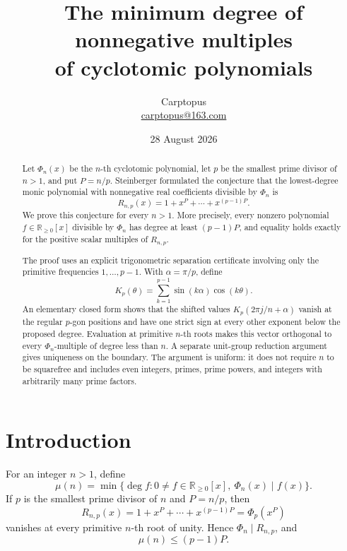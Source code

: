 \documentclass[11pt]{article}
\title{The minimum degree of nonnegative multiples\\
of cyclotomic polynomials}
\author{Carptopus\\\href{mailto:carptopus@163.com}{carptopus@163.com}}
\date{28 August 2026}
\numberwithin{equation}{section}
\begin{document}
\maketitle

\begin{center}
\end{center}

\begin{abstract}
Let $\Phi_n(x)$ be the $n$-th cyclotomic polynomial, let $p$ be the smallest
prime divisor of $n>1$, and put $P=n/p$. Steinberger formulated the conjecture
that the lowest-degree monic polynomial with nonnegative real coefficients
divisible by $\Phi_n$ is
\[
R_{n,p}(x)=1+x^P+\cdots+x^{(p-1)P}.
\]
We prove this conjecture for every $n>1$. More precisely, every nonzero
polynomial $f\in\mathbb R_{\geq0}[x]$ divisible by $\Phi_n$ has degree at
least $(p-1)P$, and equality holds exactly for the positive scalar multiples
of $R_{n,p}$.

The proof uses an explicit trigonometric separation certificate involving only
the primitive frequencies $1,\ldots,p-1$. With $\alpha=\pi/p$, define
\[
K_p(\theta)=\sum_{k=1}^{p-1}\sin(k\alpha)\cos(k\theta).
\]
An elementary closed form shows that the shifted values
$K_p(2\pi j/n+\alpha)$ vanish at the regular $p$-gon positions and have one
strict sign at every other exponent below the proposed degree. Evaluation at
primitive $n$-th roots makes this vector orthogonal to every $\Phi_n$-multiple
of degree less than $n$. A separate unit-group reduction argument gives
uniqueness on the boundary. The argument is uniform: it does not require $n$
to be squarefree and includes even integers, primes, prime powers, and integers
with arbitrarily many prime factors.
\end{abstract}

\section{Introduction}

For an integer $n>1$, define
\begin{equation}
\mu(n)=\min\{\deg f:0\ne f\in\mathbb R_{\geq0}[x],\ \Phi_n(x)\mid f(x)\}.
\label{eq:mu}
\end{equation}
If $p$ is the smallest prime divisor of $n$ and $P=n/p$, then
\begin{equation}
R_{n,p}(x)=1+x^P+\cdots+x^{(p-1)P}=\Phi_p(x^P)
\label{eq:regular}
\end{equation}
vanishes at every primitive $n$-th root of unity. Hence $\Phi_n\mid R_{n,p}$,
and
\begin{equation}
\mu(n)\leq(p-1)P.
\label{eq:upper}
\end{equation}
\end{document}
